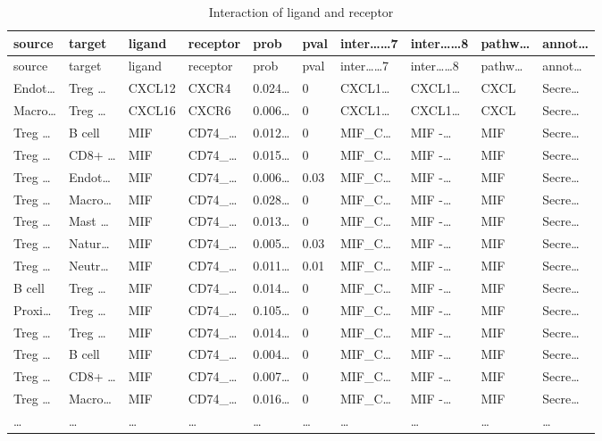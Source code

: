 \documentclass[
]{article}
\begin{document}
\begin{longtable}[]{@{}llllllllll@{}}
\caption{\label{tab:Interaction-of-ligand-and-receptor}Interaction of ligand and receptor}\tabularnewline
\toprule
source & target & ligand & receptor & prob & pval & inter\ldots\ldots7 & inter\ldots\ldots8 & pathw\ldots{} & annot\ldots{}\tabularnewline
\midrule
\endfirsthead
\toprule
source & target & ligand & receptor & prob & pval & inter\ldots\ldots7 & inter\ldots\ldots8 & pathw\ldots{} & annot\ldots{}\tabularnewline
\midrule
\endhead
Endot\ldots{} & Treg \ldots{} & CXCL12 & CXCR4 & 0.024\ldots{} & 0 & CXCL1\ldots{} & CXCL1\ldots{} & CXCL & Secre\ldots{}\tabularnewline
Macro\ldots{} & Treg \ldots{} & CXCL16 & CXCR6 & 0.006\ldots{} & 0 & CXCL1\ldots{} & CXCL1\ldots{} & CXCL & Secre\ldots{}\tabularnewline
Treg \ldots{} & B cell & MIF & CD74\_\ldots{} & 0.012\ldots{} & 0 & MIF\_C\ldots{} & MIF -\ldots{} & MIF & Secre\ldots{}\tabularnewline
Treg \ldots{} & CD8+ \ldots{} & MIF & CD74\_\ldots{} & 0.015\ldots{} & 0 & MIF\_C\ldots{} & MIF -\ldots{} & MIF & Secre\ldots{}\tabularnewline
Treg \ldots{} & Endot\ldots{} & MIF & CD74\_\ldots{} & 0.006\ldots{} & 0.03 & MIF\_C\ldots{} & MIF -\ldots{} & MIF & Secre\ldots{}\tabularnewline
Treg \ldots{} & Macro\ldots{} & MIF & CD74\_\ldots{} & 0.028\ldots{} & 0 & MIF\_C\ldots{} & MIF -\ldots{} & MIF & Secre\ldots{}\tabularnewline
Treg \ldots{} & Mast \ldots{} & MIF & CD74\_\ldots{} & 0.013\ldots{} & 0 & MIF\_C\ldots{} & MIF -\ldots{} & MIF & Secre\ldots{}\tabularnewline
Treg \ldots{} & Natur\ldots{} & MIF & CD74\_\ldots{} & 0.005\ldots{} & 0.03 & MIF\_C\ldots{} & MIF -\ldots{} & MIF & Secre\ldots{}\tabularnewline
Treg \ldots{} & Neutr\ldots{} & MIF & CD74\_\ldots{} & 0.011\ldots{} & 0.01 & MIF\_C\ldots{} & MIF -\ldots{} & MIF & Secre\ldots{}\tabularnewline
B cell & Treg \ldots{} & MIF & CD74\_\ldots{} & 0.014\ldots{} & 0 & MIF\_C\ldots{} & MIF -\ldots{} & MIF & Secre\ldots{}\tabularnewline
Proxi\ldots{} & Treg \ldots{} & MIF & CD74\_\ldots{} & 0.105\ldots{} & 0 & MIF\_C\ldots{} & MIF -\ldots{} & MIF & Secre\ldots{}\tabularnewline
Treg \ldots{} & Treg \ldots{} & MIF & CD74\_\ldots{} & 0.014\ldots{} & 0 & MIF\_C\ldots{} & MIF -\ldots{} & MIF & Secre\ldots{}\tabularnewline
Treg \ldots{} & B cell & MIF & CD74\_\ldots{} & 0.004\ldots{} & 0 & MIF\_C\ldots{} & MIF -\ldots{} & MIF & Secre\ldots{}\tabularnewline
Treg \ldots{} & CD8+ \ldots{} & MIF & CD74\_\ldots{} & 0.007\ldots{} & 0 & MIF\_C\ldots{} & MIF -\ldots{} & MIF & Secre\ldots{}\tabularnewline
Treg \ldots{} & Macro\ldots{} & MIF & CD74\_\ldots{} & 0.016\ldots{} & 0 & MIF\_C\ldots{} & MIF -\ldots{} & MIF & Secre\ldots{}\tabularnewline
\ldots{} & \ldots{} & \ldots{} & \ldots{} & \ldots{} & \ldots{} & \ldots{} & \ldots{} & \ldots{} & \ldots{}\tabularnewline
\bottomrule
\end{longtable}
\end{document}
